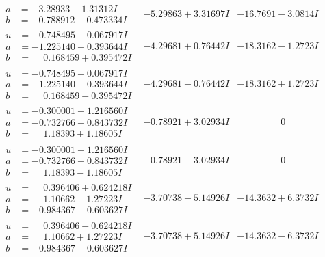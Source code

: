 \documentclass[1p]{elsarticle_modified}
\theoremstyle{definition}
\begin{document}
$$\begin{array}{c|c|c}
\begin{aligned}
a &= -3.28933 - 1.31312 I \\
b &= -0.788912 - 0.473334 I\end{aligned}
 & -5.29863 + 3.31697 I & -16.7691 - 3.0814 I \\ \hline\begin{aligned}
u &= -0.748495 + 0.067917 I \\
a &= -1.225140 - 0.393644 I \\
b &= \phantom{-}0.168459 + 0.395472 I\end{aligned}
 & -4.29681 + 0.76442 I & -18.3162 - 1.2723 I \\ \hline\begin{aligned}
u &= -0.748495 - 0.067917 I \\
a &= -1.225140 + 0.393644 I \\
b &= \phantom{-}0.168459 - 0.395472 I\end{aligned}
 & -4.29681 - 0.76442 I & -18.3162 + 1.2723 I \\ \hline\begin{aligned}
u &= -0.300001 + 1.216560 I \\
a &= -0.732766 - 0.843732 I \\
b &= \phantom{-}1.18393 + 1.18605 I\end{aligned}
 & -0.78921 + 3.02934 I & \phantom{-0.000000 } 0 \\ \hline\begin{aligned}
u &= -0.300001 - 1.216560 I \\
a &= -0.732766 + 0.843732 I \\
b &= \phantom{-}1.18393 - 1.18605 I\end{aligned}
 & -0.78921 - 3.02934 I & \phantom{-0.000000 } 0 \\ \hline\begin{aligned}
u &= \phantom{-}0.396406 + 0.624218 I \\
a &= \phantom{-}1.10662 - 1.27223 I \\
b &= -0.984367 + 0.603627 I\end{aligned}
 & -3.70738 - 5.14926 I & -14.3632 + 6.3732 I \\ \hline\begin{aligned}
u &= \phantom{-}0.396406 - 0.624218 I \\
a &= \phantom{-}1.10662 + 1.27223 I \\
b &= -0.984367 - 0.603627 I\end{aligned}
 & -3.70738 + 5.14926 I & -14.3632 - 6.3732 I \\ \hline\begin{aligned}

\end{aligned}
\end{array}$$
\end{document}
